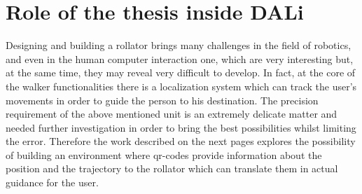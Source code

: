 \section{Role of the thesis inside DALi}
\vspace{0.5cm}
Designing and building a rollator brings many challenges in the field of robotics, and even in the human computer interaction one, which are very interesting but, at the same time, they may reveal very difficult to develop. 
In fact, at the core of the walker functionalities there is a localization system which can track the user's movements in order to guide the person to his destination.
The precision requirement of the above mentioned unit is an extremely delicate matter and needed further investigation in order to bring the best possibilities whilst limiting the error.
Therefore the work described on the next pages explores the possibility of building an environment where qr-codes provide information about the position and the trajectory to the rollator which can translate them in actual guidance for the user.






  
